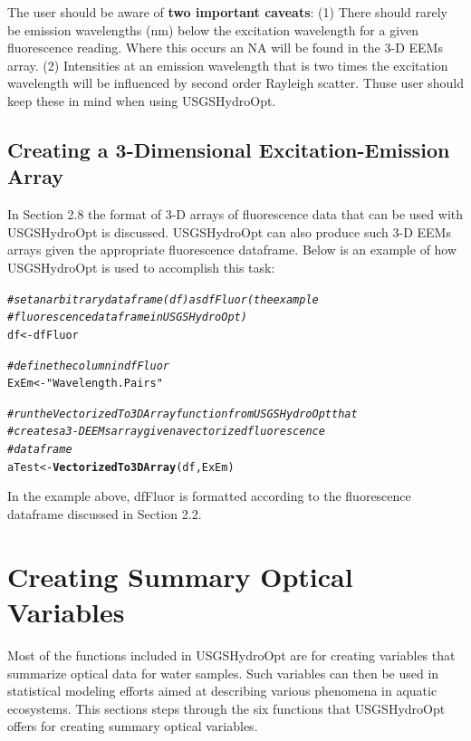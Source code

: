 \documentclass[a4paper,11pt]{article}\usepackage[]{graphicx}\usepackage[]{color}
\makeatletter
\newcommand{\hlstr}[1]{\textcolor[rgb]{0.192,0.494,0.8}{#1}}%
\newcommand{\hlcom}[1]{\textcolor[rgb]{0.678,0.584,0.686}{\textit{#1}}}%
\newcommand{\hlstd}[1]{\textcolor[rgb]{0.345,0.345,0.345}{#1}}%
\newcommand{\hlkwb}[1]{\textcolor[rgb]{0.69,0.353,0.396}{#1}}%
\newcommand{\hlkwd}[1]{\textcolor[rgb]{0.737,0.353,0.396}{\textbf{#1}}}%
\newenvironment{kframe}{%
 \def\at@end@of@kframe{}%
 \ifinner\ifhmode%
  \def\at@end@of@kframe{\end{minipage}}%
  \begin{minipage}{\columnwidth}%
 \fi\fi%
 \def\FrameCommand##1{\hskip\@totalleftmargin \hskip-\fboxsep
 \colorbox{shadecolor}{##1}\hskip-\fboxsep
     \hskip-\linewidth \hskip-\@totalleftmargin \hskip\columnwidth}%
 \MakeFramed {\advance\hsize-\width
   \@totalleftmargin\z@ \linewidth\hsize
   \@setminipage}}%
 {\par\unskip\endMakeFramed%
 \at@end@of@kframe}
\newenvironment{knitrout}{}{} %
\makeatother
\begin{document}
The user should be aware of \textbf{two important caveats}: (1) There should rarely be emission wavelengths (nm) below the excitation wavelength for a given fluorescence reading. Where this occurs an NA will be found in the 3-D EEMs array. (2) Intensities at an emission wavelength that is two times the excitation wavelength will be influenced by second order Rayleigh scatter. Thuse user should keep these in mind when using USGSHydroOpt.

\subsection{Creating a 3-Dimensional Excitation-Emission Array}
In Section 2.8 the format of 3-D arrays of fluorescence data that can be used with USGSHydroOpt is discussed. USGSHydroOpt can also  produce such 3-D EEMs arrays given the appropriate fluorescence dataframe. Below is an example of how USGSHydroOpt is used to accomplish this task: 

\begin{knitrout}
\color{fgcolor}\begin{kframe}
\begin{alltt}
\hlcom{# set an arbitrary data frame (df) as dfFluor (the example}
\hlcom{# fluorescence dataframe in USGSHydroOpt)}
\hlstd{df} \hlkwb{<-} \hlstd{dfFluor}

\hlcom{# define the column in dfFluor}
\hlstd{ExEm} \hlkwb{<-} \hlstr{"Wavelength.Pairs"}

\hlcom{# run the VectorizedTo3DArray function from USGSHydroOpt that}
\hlcom{# creates a 3-D EEMs array given a vectorized fluorescence}
\hlcom{# dataframe}
\hlstd{aTest} \hlkwb{<-} \hlkwd{VectorizedTo3DArray}\hlstd{(df, ExEm)}
\end{alltt}
\end{kframe}
\end{knitrout}

In the example above, dfFluor is formatted according to the fluorescence dataframe discussed in Section 2.2. 

\section{Creating Summary Optical Variables}
Most of the functions included in USGSHydroOpt are for creating variables that summarize optical data for water samples. Such variables can then be used in statistical modeling efforts aimed at describing various phenomena in aquatic ecosystems. This sections steps through the six functions that USGSHydroOpt offers for creating summary optical variables.
\end{document}

